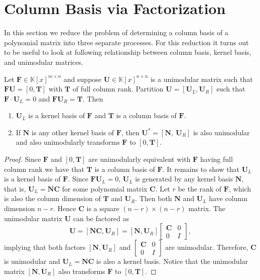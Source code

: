 
\section{Column Basis via Factorization}

In this section we reduce the problem of determining a column basis
of a polynomial matrix into three separate processes. For this reduction
it turns out to be %
useful to look at following relationship between column basis, kernel
basis, and unimodular matrices.
\begin{lem}
\label{lem:unimodular_kernel_columnBasis} Let $\mathbf{F}\in\mathbb{K}\left[x\right]^{m\times n}$
and suppose $\mathbf{U}\in\mathbb{K}\left[x\right]^{n\times n}$ is
a unimodular matrix such that $\mathbf{F}\mathbf{U}=\left[0,\mathbf{T}\right]$
with $\mathbf{T}$ of full column rank. Partition $\mathbf{U}=\left[\mathbf{U}_{L},\mathbf{U}_{R}\right]$
such that $\mathbf{F}\cdot\mathbf{U}_{L}=0$ and $\mathbf{F}\mathbf{U}_{R}=\mathbf{T}$.
Then 
\begin{enumerate}
\item $\mathbf{U}_{L}$ is a kernel basis of $\mathbf{F}$ and $\mathbf{T}$
is a column basis of $\mathbf{F}$. 
\item If $\mathbf{N}$ is any other kernel basis of $\mathbf{F}$, then
$\mathbf{U}^{*}=\left[\mathbf{N},~\mathbf{U}_{R}\right]$ is also
unimodular and also unimodularly transforms $\mathbf{F}$ to $\left[0,\mathbf{T}\right]$. 
\end{enumerate}
\end{lem}
\begin{proof}
Since $\mathbf{F}$ and $\left[0,\mathbf{T}\right]$ are unimodularly
equivalent with $\mathbf{F}$ having full column rank we have that
$\mathbf{T}$ is a column basis of $\mathbf{F}$. It remains to show
that $\mathbf{U}_{L}$ is a kernel basis of $\mathbf{F}$. Since $\mathbf{F}\mathbf{U}_{L}=0$,
$\mathbf{U}_{L}$ is generated by any kernel basis $\mathbf{N}$,
that is, $\mathbf{U}_{L}=\mathbf{N}\mathbf{C}$ for some polynomial
matrix $\mathbf{C}$. Let $r$ be the rank of $\mathbf{F}$, which
is also the column dimension of $\mathbf{T}$ and $\mathbf{U}_{R}$.
Then both $\mathbf{N}$ and $\mathbf{U}_{L}$ have column dimension
$n-r$. Hence $\mathbf{C}$ is a square $(n-r)\times(n-r)$ matrix.
The unimodular matrix $\mathbf{U}$ can be factored as 
\[
\mathbf{U}=\left[\mathbf{N}\mathbf{C},\mathbf{U}_{R}\right]=\left[\mathbf{N},\mathbf{U}_{R}\right]\begin{bmatrix}\mathbf{C} & 0\\
0 & I
\end{bmatrix},
\]
implying that both factors $\left[\mathbf{N},\mathbf{U}_{R}\right]$
and $\begin{bmatrix}\mathbf{C} & 0\\
0 & I
\end{bmatrix}$ are unimodular. Therefore, $\mathbf{C}$ is unimodular and $\mathbf{U}_{L}=\mathbf{N}\mathbf{C}$
is also a kernel basis. Notice that the unimodular matrix $\left[\mathbf{N},\mathbf{U}_{R}\right]$
also transforms $\mathbf{F}$ to $\left[0,\mathbf{T}\right]$. \end{proof}
